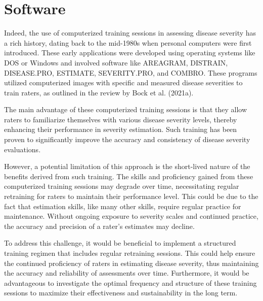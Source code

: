 \documentclass[
  letterpaper,
  DIV=11,
  numbers=noendperiod]{scrreprt}
\begin{document}
\hypertarget{software-1}{%
\section{Software}\label{software-1}}

Indeed, the use of computerized training sessions in assessing disease
severity has a rich history, dating back to the mid-1980s when personal
computers were first introduced. These early applications were developed
using operating systems like DOS or Windows and involved software like
AREAGRAM, DISTRAIN, DISEASE.PRO, ESTIMATE, SEVERITY.PRO, and COMBRO.
These programs utilized computerized images with specific and measured
disease severities to train raters, as outlined in the review by Bock et
al. (2021a).

The main advantage of these computerized training sessions is that they
allow raters to familiarize themselves with various disease severity
levels, thereby enhancing their performance in severity estimation. Such
training has been proven to significantly improve the accuracy and
consistency of disease severity evaluations.

However, a potential limitation of this approach is the short-lived
nature of the benefits derived from such training. The skills and
proficiency gained from these computerized training sessions may degrade
over time, necessitating regular retraining for raters to maintain their
performance level. This could be due to the fact that estimation skills,
like many other skills, require regular practice for maintenance.
Without ongoing exposure to severity scales and continued practice, the
accuracy and precision of a rater's estimates may decline.

To address this challenge, it would be beneficial to implement a
structured training regimen that includes regular retraining sessions.
This could help ensure the continued proficiency of raters in estimating
disease severity, thus maintaining the accuracy and reliability of
assessments over time. Furthermore, it would be advantageous to
investigate the optimal frequency and structure of these training
sessions to maximize their effectiveness and sustainability in the long
term.
\end{document}
